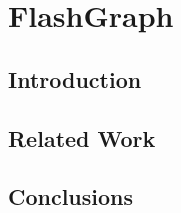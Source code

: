 \chapter{FlashGraph}
\label{sec:fg}
\chaptermark{}

\section{Introduction}


\section{Related Work}






\section{Conclusions}

